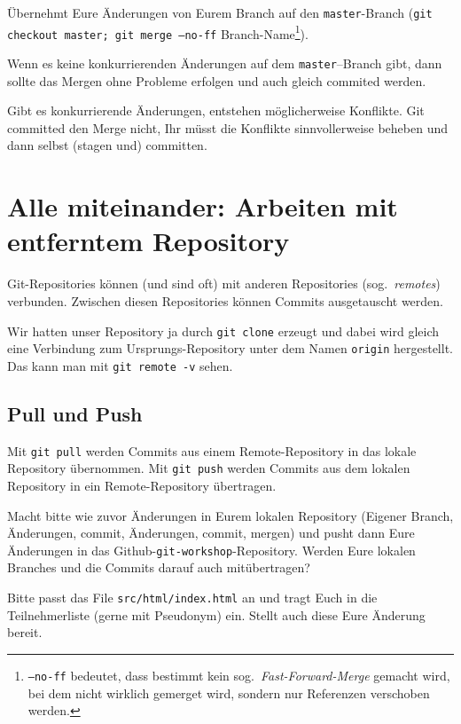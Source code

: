 \documentclass[a4paper, 12pt]{article}
\newcounter{enumisave}
\newenvironment{enumerate*}%
{\begin{enumerate}\setcounter{enumi}{\theenumisave}}%
{\setcounter{enumisave}{\theenumi}\end{enumerate}}
\begin{document}
\begin{enumerate*}

\item Übernehmt Eure Änderungen von Eurem Branch auf den \texttt{master}-Branch (\texttt{git checkout master; git merge --no-ff} \textsf{Branch-Name}\footnote{\texttt{--no-ff} bedeutet, dass bestimmt kein sog.\ \emph{Fast-Forward-Merge} gemacht wird, bei dem nicht wirklich gemerget wird, sondern nur Referenzen verschoben werden.}).

Wenn es keine konkurrierenden Änderungen auf dem \texttt{master}--Branch gibt,
dann sollte das Mergen ohne Probleme erfolgen und auch gleich commited werden.

Gibt es konkurrierende Änderungen, entstehen möglicherweise Konflikte. Git committed den Merge nicht, Ihr müsst die Konflikte sinnvollerweise beheben und
dann selbst (stagen und) committen.

\end{enumerate*}

\newpage
\section{Alle miteinander: Arbeiten mit entferntem Repository}
Git-Repositories können (und sind oft) mit anderen Repositories (sog.\ \emph{remotes}) verbunden. Zwischen diesen Repositories können Commits ausgetauscht
werden. 

Wir hatten unser Repository ja durch \texttt{git clone} erzeugt und dabei wird gleich eine Verbindung zum Ursprungs-Repository unter dem Namen \texttt{origin} hergestellt. Das kann man mit \texttt{git remote -v} sehen.


\subsection*{Pull und Push}\vspace{-1.5ex}
Mit \texttt{git pull} werden Commits aus einem Remote-Repository in das lokale
Repository übernommen. Mit \texttt{git push} werden Commits aus dem lokalen Repository in ein Remote-Repository übertragen.

\begin{enumerate*}
\item Macht bitte wie zuvor Änderungen in Eurem lokalen Repository (Eigener Branch, Änderungen, commit, Änderungen, commit, mergen) und pusht dann Eure Änderungen in das Github-\texttt{git-workshop}-Repository. Werden Eure lokalen Branches und die Commits darauf auch mitübertragen?

\item Bitte passt das File \texttt{src/html/index.html} an und tragt Euch in die Teilnehmerliste (gerne mit Pseudonym) ein. Stellt auch diese Eure Änderung bereit.

\end{enumerate*}
\end{document}
